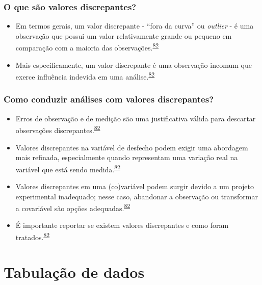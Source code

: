 \documentclass[
  a4paper,
]{book}
\begin{document}
\hypertarget{o-que-suxe3o-valores-discrepantes}{%
\subsection{O que são valores discrepantes?}\label{o-que-suxe3o-valores-discrepantes}}

\begin{itemize}
\item
  Em termos gerais, um valor discrepante - ``fora da curva'' ou \emph{outlier} - é uma observação que possui um valor relativamente grande ou pequeno em comparação com a maioria das observações.\textsuperscript{\protect\hyperlink{ref-zuur2009}{82}}
\item
  Mais especificamente, um valor discrepante é uma observação incomum que exerce influência indevida em uma análise.\textsuperscript{\protect\hyperlink{ref-zuur2009}{82}}
\end{itemize}

\hypertarget{como-conduzir-anuxe1lises-com-valores-discrepantes}{%
\subsection{Como conduzir análises com valores discrepantes?}\label{como-conduzir-anuxe1lises-com-valores-discrepantes}}

\begin{itemize}
\item
  Erros de observação e de medição são uma justificativa válida para descartar observações discrepantes.\textsuperscript{\protect\hyperlink{ref-zuur2009}{82}}
\item
  Valores discrepantes na variável de desfecho podem exigir uma abordagem mais refinada, especialmente quando representam uma variação real na variável que está sendo medida.\textsuperscript{\protect\hyperlink{ref-zuur2009}{82}}
\item
  Valores discrepantes em uma (co)variável podem surgir devido a um projeto experimental inadequado; nesse caso, abandonar a observação ou transformar a covariável são opções adequadas.\textsuperscript{\protect\hyperlink{ref-zuur2009}{82}}
\item
  É importante reportar se existem valores discrepantes e como foram tratados.\textsuperscript{\protect\hyperlink{ref-zuur2009}{82}}
\end{itemize}

\hypertarget{tabulacao-dados}{%
\chapter{\texorpdfstring{\textbf{Tabulação de dados}}{Tabulação de dados}}\label{tabulacao-dados}}
\end{document}
